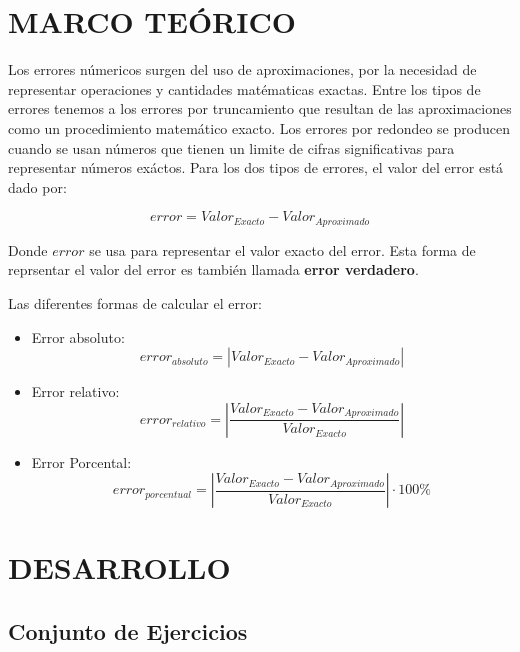 \documentclass[12pt]{article}
\begin{document}
\section*{MARCO TEÓRICO}

Los errores númericos surgen del uso de aproximaciones, por la necesidad de representar
operaciones y cantidades matématicas exactas.
Entre los tipos de errores tenemos a los errores por truncamiento que resultan de 
las aproximaciones como un procedimiento matemático exacto.
Los errores por redondeo se producen cuando se usan números que tienen un limite
de cifras significativas para representar números exáctos.
Para los dos tipos de errores, el valor del error está dado por:

\[error = Valor_{Exacto} - Valor_{Aproximado}\]\cite{chapra2011metodos}

Donde \(error\) se usa para representar el valor exacto del error. Esta forma de reprsentar el
valor del error es también llamada \textbf{error verdadero}.

Las diferentes formas de calcular el error:

\begin{itemize}
    \item {Error absoluto:}
    \[error_{absoluto} = \left|Valor_{Exacto} - Valor_{Aproximado} \right|\]
    \item {Error relativo:}
    \[error_{relativo} = \left|\frac{Valor_{Exacto} - Valor_{Aproximado}}{Valor_{Exacto}} \right|\]
    \item {Error Porcental:}
    \[error_{porcentual} = \left|\frac{Valor_{Exacto} - Valor_{Aproximado}}{Valor_{Exacto}} \right| \cdot 100\%\]
\end{itemize}

\vspace{0.5cm}

\section*{DESARROLLO}

\subsection*{Conjunto de Ejercicios}
\end{document}
